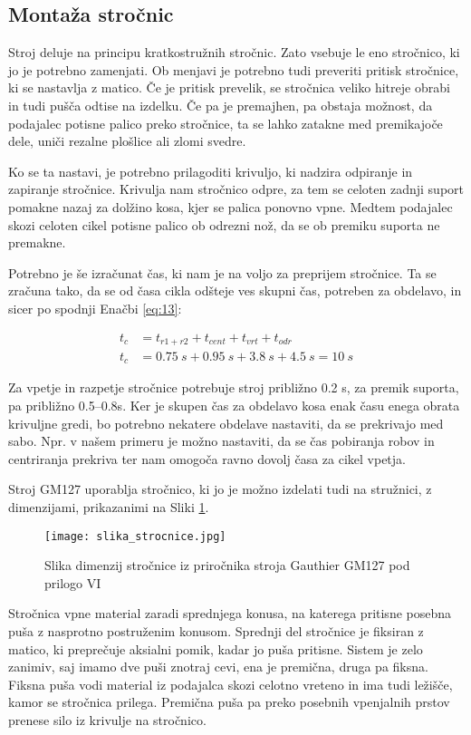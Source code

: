 \newpage

\subsection{Montaža stročnic}
Stroj deluje na principu kratkostružnih stročnic. Zato vsebuje le eno stročnico,
ki jo je potrebno zamenjati. Ob menjavi je potrebno tudi preveriti pritisk
stročnice, ki se nastavlja z matico. Če je pritisk prevelik, se stročnica veliko
hitreje obrabi in tudi pušča odtise na izdelku. Če pa je premajhen, pa obstaja možnost,
da podajalec potisne palico preko stročnice, ta se lahko zatakne med
premikajoče dele, uniči rezalne plošlice ali zlomi svedre.

Ko se ta nastavi, je potrebno prilagoditi krivuljo, ki nadzira odpiranje in
zapiranje stročnice. Krivulja nam stročnico odpre, za tem se celoten zadnji suport
pomakne nazaj za dolžino kosa, kjer se palica ponovno vpne. Medtem podajalec
skozi celoten cikel potisne palico ob odrezni nož, da se ob premiku suporta ne premakne.

Potrebno je še izračunat čas, ki nam je na voljo za preprijem stročnice.
Ta se zračuna tako, da se od časa cikla odšteje ves skupni čas, potreben
za obdelavo, in sicer po spodnji Enačbi \ref{eq:13}:

\begin{equation}
	\label{eq:13}
	\begin{split}
		t_c &= t_{r1+r2} + t_{cent} + t_{vrt} + t_{odr} \\
		t_c &= 0.75\ s + 0.95\ s + 3.8\ s + 4.5\ s = 10\ s
	\end{split}
\end{equation}

Za vpetje in razpetje stročnice potrebuje stroj približno 0.2 s, za premik
suporta, pa približno 0.5--0.8s. Ker je skupen čas za obdelavo kosa
enak času enega obrata krivuljne gredi, bo potrebno nekatere obdelave
nastaviti, da se prekrivajo med sabo. Npr. v našem primeru je možno
nastaviti, da se čas pobiranja robov in centriranja prekriva ter
nam omogoča ravno dovolj časa za cikel vpetja.

Stroj GM127 uporablja stročnico, ki jo je možno izdelati tudi na stružnici, z dimenzijami, prikazanimi na Sliki \ref{slika_strocnice}.

\begin{figure}[H]
	\begin{center}
		\texttt{[image: slika\_strocnice.jpg]}
		\caption{Slika dimenzij stročnice iz priročnika
			stroja Gauthier GM127 pod prilogo VI
			\cite{gauthier}}
		\label{slika_strocnice}
	\end{center}
\end{figure}

Stročnica vpne material zaradi sprednjega konusa, na katerega
pritisne posebna puša z nasprotno postruženim konusom. Sprednji
del stročnice je fiksiran z matico, ki preprečuje aksialni pomik,
kadar jo puša pritisne. Sistem je zelo zanimiv, saj imamo dve
puši znotraj cevi, ena je premična, druga pa fiksna. Fiksna puša
vodi material iz podajalca skozi celotno vreteno in ima tudi
ležišče, kamor se stročnica prilega. Premična puša pa preko
posebnih vpenjalnih prstov prenese silo iz krivulje na stročnico.